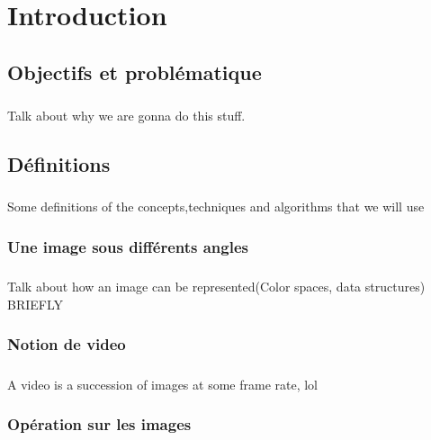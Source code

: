 \documentclass[12pt]{report}
\begin{document}
 
\tableofcontents
\listoffigures
\listoftables


\newpage

\chapter{Introduction}
\section{Objectifs et problématique}
\paragraph{}
Talk about why we are gonna do this stuff.

\section{Définitions}
\paragraph{}
Some definitions of the concepts,techniques and algorithms that we will use

\subsection{Une image sous différents angles}
\paragraph{}
Talk about how an image can be represented(Color spaces, data structures) BRIEFLY

\subsection{Notion de video}
\paragraph{}
A video is a succession of images at some frame rate, lol

\subsection{Opération sur les images}
\end{document}
